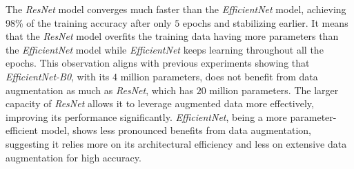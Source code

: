 The \textit{ResNet} model converges much faster than the \textit{EfficientNet} model, achieving 98\% of the training accuracy after only $5$ epochs and stabilizing earlier. It means that the \textit{ResNet} model overfits the training data having more parameters than the \textit{EfficientNet} model while \textit{EfficientNet} keeps learning throughout all the epochs. This observation aligns with previous experiments showing that \textit{EfficientNet-B0}, with its $4$ million parameters, does not benefit from data augmentation as much as \textit{ResNet}, which has $20$ million parameters. The larger capacity of \textit{ResNet} allows it to leverage augmented data more effectively, improving its performance significantly. \textit{EfficientNet}, being a more parameter-efficient model, shows less pronounced benefits from data augmentation, suggesting it relies more on its architectural efficiency and less on extensive data augmentation for high accuracy.

